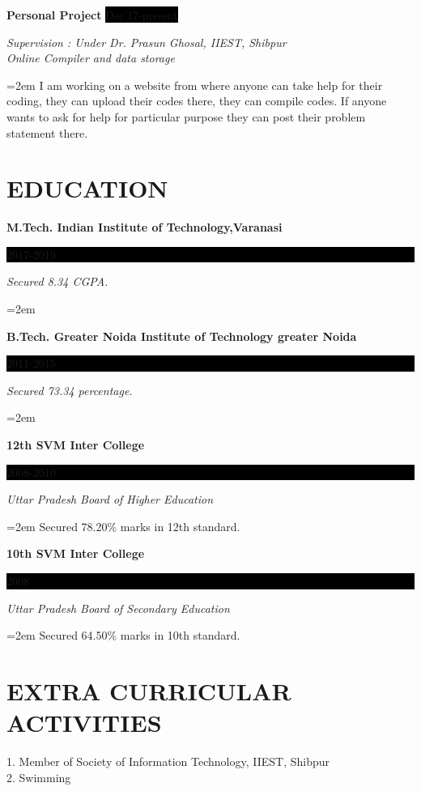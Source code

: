 \documentclass[paper=a4,fontsize=11pt]{scrartcl} %
\newcommand{\sepspace}{\vspace*{1em}}		%
\newcommand{\NewPart}[1]{\section*{\uppercase{#1}}}
\newcommand{\EducationEntry}[4]{
		\noindent \textbf{#1} \hfill      %
		\colorbox{Black}{%
			\parbox{6em}{%
			\hfill\color{White}#2}} \par  %
		\noindent \textit{#3} \par        %
		\noindent\hangindent=2em\hangafter=0 \small #4 %
		\normalsize \par}
\newcommand{\WorkEntry}[4]{				  %
		\noindent \textbf{#1} \hfill      %
		\colorbox{Black}{\color{White}#2} \par  %
		\noindent \textit{#3} \par              %
		\noindent\hangindent=2em\hangafter=0 \small #4 %
		\normalsize \par}
\begin{document}
\WorkEntry{Personal Project}{Dec'17-present}{Supervision : Under Dr. Prasun Ghosal, IIEST, Shibpur\\Online Compiler and data storage}{I am working on a website from where anyone can take help for their coding, they can upload their codes
there, they can compile codes. If anyone wants to ask for help for particular purpose they can post their
problem statement there.}

\NewPart{Education}{}

\EducationEntry{M.Tech. Indian Institute of Technology,Varanasi }{2017-2019}{Secured 8.34  CGPA.}

\sepspace

\EducationEntry{B.Tech. Greater Noida Institute of Technology greater Noida}{2011-2015}{Secured 73.34 percentage.}

\sepspace

\EducationEntry{12th SVM Inter College}{2008-2010}{Uttar Pradesh Board of
Higher Education}{Secured 78.20\% marks in 12th standard.}
\sepspace

\EducationEntry{10th SVM Inter College}{2008}{Uttar Pradesh Board of
Secondary Education}{Secured 64.50\% marks in 10th standard.}


\NewPart{Extra Curricular Activities}{}
1. Member of Society of Information Technology, IIEST, Shibpur
\\
\sepspace
2. Swimming
\end{document}
